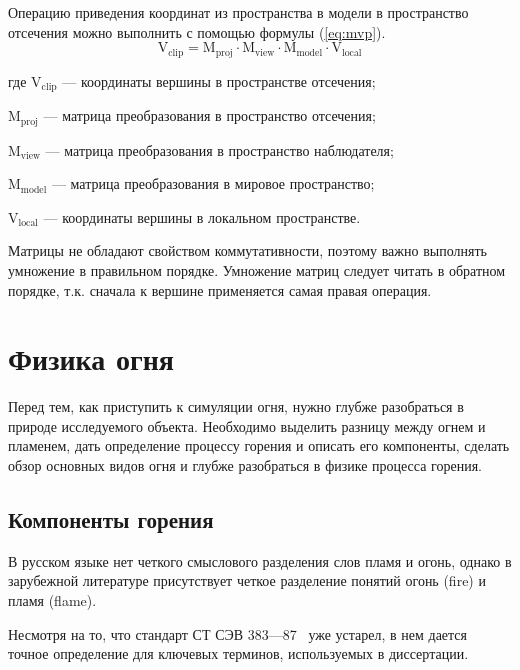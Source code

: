 Операцию приведения координат из пространства в модели в пространство отсечения
можно выполнить с помощью формулы (\ref{eq:mvp}).
\begin{equation}
  \label{eq:mvp}
  \text{V}_\text{clip} = \text{M}_\text{proj} \cdot \text{M}_\text{view} \cdot
  \text{M}_\text{model} \cdot \text{V}_\text{local}
\end{equation}
\begin{explanationx}
    \item [где] $\text{V}_\text{clip}$ --- координаты вершины в пространстве
        отсечения;
    \item $\text{M}_\text{proj}$ --- матрица преобразования в пространство
        отсечения;
    \item $\text{M}_\text{view}$ --- матрица преобразования в пространство
        наблюдателя;
    \item $\text{M}_\text{model}$ --- матрица преобразования в мировое
        пространство;
    \item $\text{V}_\text{local}$ --- координаты вершины в локальном
        пространстве.
\end{explanationx}

Матрицы не обладают свойством коммутативности, поэтому важно выполнять умножение
в правильном порядке. Умножение матриц следует читать в обратном порядке,
т\@.к\@. сначала к вершине применяется самая правая операция.

\section{Физика огня}

Перед тем, как приступить к симуляции огня, нужно глубже разобраться в природе
исследуемого объекта. Необходимо выделить разницу между огнем и пламенем,
дать определение процессу горения и описать его компоненты, сделать обзор
основных видов огня и глубже разобраться в физике процесса горения.

\subsection{Компоненты горения}

В русском языке нет четкого смыслового разделения слов пламя и
огонь\break{}\cite{WikiFlame}, однако в зарубежной литературе присутствует четкое
разделение понятий огонь (fire) и пламя (flame).

Несмотря на то, что стандарт СТ СЭВ 383—87~\cite{383-87} уже устарел, в нем
дается точное определение для ключевых терминов, используемых в диссертации.

